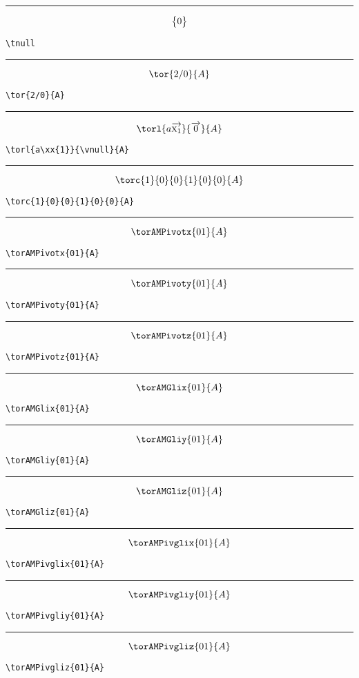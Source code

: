 \documentclass[a4paper,9pt]{article}
\begin{document}
\hrule

$$\big\{0\big\}$$
\begin{verbatim}
\tnull
\end{verbatim}

\hrule

$$\tor{2/0}{A}$$
\begin{verbatim}
\tor{2/0}{A}
\end{verbatim}

\hrule

$$\torl{a\xx{1}}{\vnull}{A}$$
\begin{verbatim}
\torl{a\xx{1}}{\vnull}{A}
\end{verbatim}

\hrule

$$\torc{1}{0}{0}{1}{0}{0}{A}$$
\begin{verbatim}
\torc{1}{0}{0}{1}{0}{0}{A}
\end{verbatim}

\hrule

$$\torAMPivotx{01}{A}$$
\begin{verbatim}
\torAMPivotx{01}{A}
\end{verbatim}

\hrule

$$\torAMPivoty{01}{A}$$
\begin{verbatim}
\torAMPivoty{01}{A}
\end{verbatim}

\hrule

$$\torAMPivotz{01}{A}$$
\begin{verbatim}
\torAMPivotz{01}{A}
\end{verbatim}

\hrule

$$\torAMGlix{01}{A}$$
\begin{verbatim}
\torAMGlix{01}{A}
\end{verbatim}

\hrule

$$\torAMGliy{01}{A}$$
\begin{verbatim}
\torAMGliy{01}{A}
\end{verbatim}

\hrule

$$\torAMGliz{01}{A}$$
\begin{verbatim}
\torAMGliz{01}{A}
\end{verbatim}

\hrule

$$\torAMPivglix{01}{A}$$
\begin{verbatim}
\torAMPivglix{01}{A}
\end{verbatim}

\hrule

$$\torAMPivgliy{01}{A}$$
\begin{verbatim}
\torAMPivgliy{01}{A}
\end{verbatim}

\hrule

$$\torAMPivgliz{01}{A}$$
\begin{verbatim}
\torAMPivgliz{01}{A}
\end{verbatim}
\end{document}
